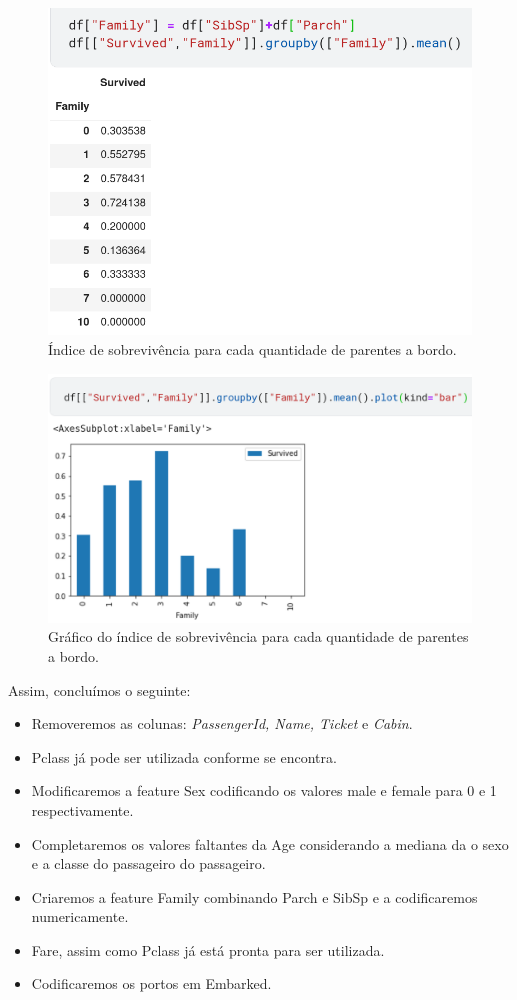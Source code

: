 \documentclass{article}
\begin{document}
\begin{figure}[H]
\centering
\includegraphics[width=\textwidth]{Figures/family_groupby.png}
\caption{\label{family.groupby}Índice de sobrevivência para cada quantidade de parentes a bordo.}
\end{figure}
\begin{figure}[H]
\centering
\includegraphics[width=\textwidth]{Figures/family_survivor_plot.png}
\caption{\label{df.groupby.plot}Gráfico do índice de sobrevivência para cada quantidade de parentes a bordo.}
\end{figure}

Assim, concluímos o seguinte:
\begin{itemize}
\item Removeremos as colunas: \textit{PassengerId, Name, Ticket} e \textit{Cabin}. 
\item Pclass já pode ser utilizada conforme se encontra.
\item Modificaremos a feature Sex codificando os valores male e female para 0 e 1 respectivamente. 
\item Completaremos os valores faltantes da Age considerando a mediana da o sexo e a classe do passageiro do passageiro. 
\item Criaremos a feature Family combinando Parch e SibSp e a codificaremos numericamente. 
\item Fare, assim como Pclass já está pronta para ser utilizada. 
\item Codificaremos os portos em Embarked.
\end{itemize}
\end{document}
